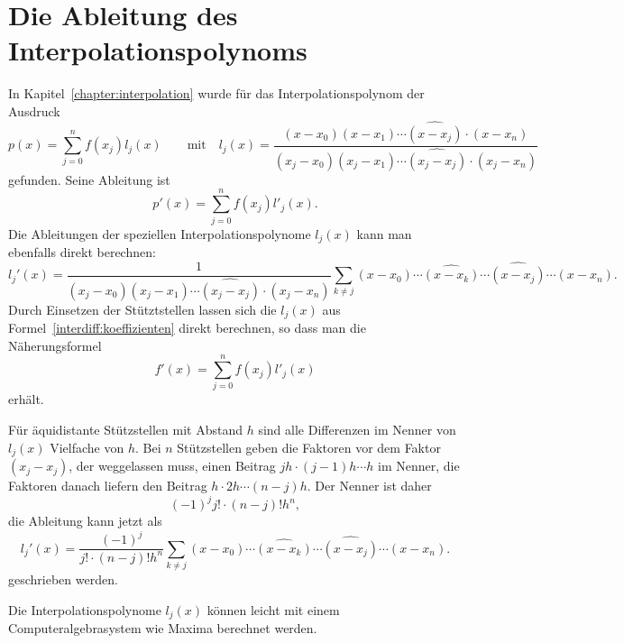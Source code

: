 \section{Die Ableitung des Interpolationspolynoms}
In Kapitel~\ref{chapter:interpolation} wurde für das Interpolationspolynom
der Ausdruck
\[
p(x)
=
\sum_{j=0}^n f(x_j) l_j(x)
\qquad\text{mit}\quad
l_j(x)
=
\frac{(x-x_0)(x-x_1)\cdots\widehat{(x-x_j)}\cdot (x-x_n)}{(x_j-x_0)(x_j-x_1)\cdots\widehat{(x_j-x_j)}\cdot (x_j-x_n)}
\]
gefunden.
Seine Ableitung ist
\[
p'(x)
=
\sum_{j=0}^n f(x_j) l'_j(x).
\]
Die Ableitungen der speziellen Interpolationspolynome $l_j(x)$ kann
man ebenfalls direkt berechnen:
\begin{equation}
l_j'(x)
=
\frac{1}{(x_j-x_0)(x_j-x_1)\cdots\widehat{(x_j-x_j)}\cdot (x_j-x_n)}
\sum_{k\ne j} (x-x_0)\cdots \widehat{(x-x_k)}\cdots\widehat{(x-x_j)}\cdots (x-x_n).
\label{interdiff:koeffizienten}
\end{equation}
Durch Einsetzen der Stütztstellen lassen sich die $l_j(x)$ aus
Formel~\eqref{interdiff:koeffizienten} direkt berechnen, so dass
man die Näherungsformel 
\begin{equation}
f'(x) = \sum_{j=0}^n f(x_j) l'_j(x)
\label{interdiff:ableitung}
\end{equation}
erhält.

Für äquidistante Stützstellen mit Abstand $h$ sind alle Differenzen im
Nenner von $l_j(x)$ Vielfache von $h$.
Bei $n$ Stützstellen geben die Faktoren vor dem Faktor $(x_j-x_j)$, der
weggelassen muss, einen Beitrag
$jh\cdot (j-1)h \cdots h$ im Nenner,
die Faktoren danach liefern den Beitrag $h\cdot 2h \cdots (n-j)h$.
Der Nenner ist daher
\[
(-1)^j
j!\cdot (n-j)! h^n,
\]
die Ableitung kann jetzt als
\begin{equation}
l_j'(x)
=
\frac{(-1)^j}{j!\cdot (n-j)! h^n}
\sum_{k\ne j} (x-x_0)\cdots \widehat{(x-x_k)}\cdots\widehat{(x-x_j)}\cdots (x-x_n).
\label{interdiff:koeffizienten2}
\end{equation}
geschrieben werden.

Die Interpolationspolynome $l_j(x)$ können leicht mit einem
Computeralgebrasystem wie Maxima berechnet werden.

